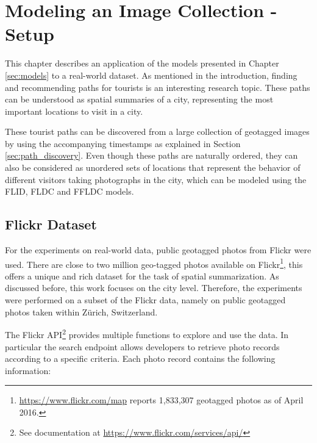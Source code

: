 \chapter{Modeling an Image Collection - Setup}
\label{sec:experimental_setup}

This chapter describes an application of the models presented in Chapter \ref{sec:models} to a real-world dataset. As mentioned in the introduction, finding and recommending paths for tourists is an interesting research topic. These paths can be understood as spatial summaries of a city, representing the most important locations to visit in a city.

These tourist paths can be discovered from a large collection of geotagged images by using the accompanying timestamps as explained in Section \ref{sec:path_discovery}. Even though these paths are naturally ordered, they can also be considered as unordered sets of locations that represent the behavior of different visitors taking photographs in the city, which can be modeled using the FLID, FLDC and FFLDC models.

\section{Flickr Dataset}

For the experiments on real-world data, public geotagged photos from Flickr were used. There are close to two million geo-tagged photos available on Flickr\footnote{\url{https://www.flickr.com/map} reports 1,833,307 geotagged photos as of April 2016.}, this offers a unique and rich dataset for the task of spatial summarization. As discussed before, this work focuses on the city level. Therefore, the experiments were performed on a subset of the Flickr data, namely on public geotagged photos taken within Zürich, Switzerland.

The Flickr API\footnote{See documentation at \url{https://www.flickr.com/services/api/}} provides multiple functions to explore and use the data. In particular the search endpoint allows developers to retrieve photo records according to a specific criteria. Each photo record contains the following information:

